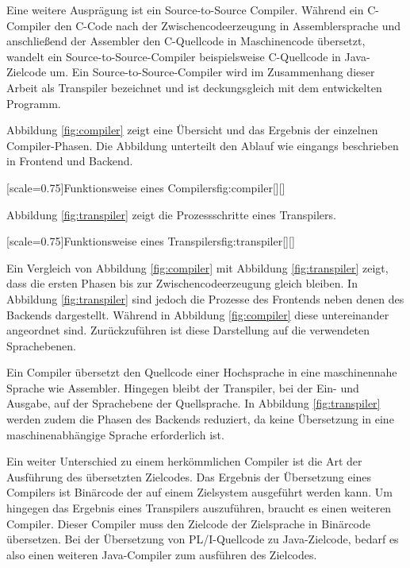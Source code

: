 Eine weitere Ausprägung ist ein Source-to-Source Compiler.
Während ein C-Compiler den C-Code nach der Zwischencodeerzeugung in Assemblersprache und anschließend der Assembler den C-Quellcode in Maschinencode übersetzt, wandelt ein Source-to-Source-Compiler beispielsweise C-Quellcode in Java-Zielcode um. 
Ein Source-to-Source-Compiler wird im Zusammenhang dieser Arbeit als Transpiler bezeichnet und ist deckungsgleich mit dem entwickelten Programm.

Abbildung \ref{fig:compiler} zeigt eine Übersicht und das Ergebnis der einzelnen Compiler-Phasen. Die Abbildung unterteilt den Ablauf wie eingangs beschrieben in Frontend und Backend.

\pagebreak
[scale=0.75]{Funktionsweise eines Compilers}{fig:compiler}[][]
\pagebreak

Abbildung \ref{fig:transpiler} zeigt die Prozessschritte eines Transpilers.

\pagebreak
{}[scale=0.75]{Funktionsweise eines Transpilers}{fig:transpiler}[][]
\pagebreak

Ein Vergleich von Abbildung \ref{fig:compiler} mit Abbildung \ref{fig:transpiler} zeigt, dass die ersten Phasen bis zur Zwischencodeerzeugung gleich bleiben. In Abbildung \ref{fig:transpiler} sind jedoch die Prozesse des Frontends neben denen des Backends dargestellt. Während in Abbildung \ref{fig:compiler} diese untereinander angeordnet sind. Zurückzuführen ist diese Darstellung auf die verwendeten Sprachebenen.

Ein Compiler übersetzt den Quellcode einer Hochsprache in eine maschinennahe Sprache wie Assembler. Hingegen bleibt der Transpiler, bei der Ein- und Ausgabe, auf der Sprachebene der Quellsprache. In Abbildung \ref{fig:transpiler} werden zudem die Phasen des Backends reduziert, da keine Übersetzung in eine maschinenabhängige Sprache erforderlich ist.

Ein weiter Unterschied zu einem herkömmlichen Compiler ist die Art der Ausführung des übersetzten Zielcodes.
Das Ergebnis der Übersetzung eines Compilers ist Binärcode der auf einem Zielsystem ausgeführt werden kann. Um hingegen das Ergebnis eines Transpilers auszuführen,
braucht es einen weiteren Compiler. Dieser Compiler muss den Zielcode der Zielsprache in Binärcode übersetzen.
Bei der Übersetzung von PL/I-Quellcode zu Java-Zielcode, bedarf es also einen weiteren Java-Compiler zum ausführen des Zielcodes.

